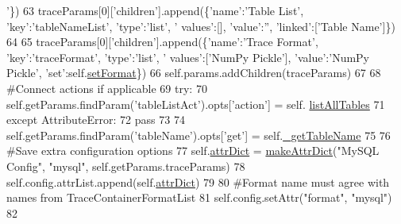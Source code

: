 \begin{DoxyCode}
{      '}\})
63             traceParams[0][\textcolor{stringliteral}{'children'}].append(\{\textcolor{stringliteral}{'name'}:\textcolor{stringliteral}{'Table List'}, \textcolor{stringliteral}{'key'}:\textcolor{stringliteral}{'tableNameList'}, \textcolor{stringliteral}{'type'}:\textcolor{stringliteral}{'list'}, \textcolor{stringliteral}{'
      values'}:[], \textcolor{stringliteral}{'value'}:\textcolor{stringliteral}{''}, \textcolor{stringliteral}{'linked'}:[\textcolor{stringliteral}{'Table Name'}]\})
64 
65         traceParams[0][\textcolor{stringliteral}{'children'}].append(\{\textcolor{stringliteral}{'name'}:\textcolor{stringliteral}{'Trace Format'}, \textcolor{stringliteral}{'key'}:\textcolor{stringliteral}{'traceFormat'}, \textcolor{stringliteral}{'type'}:\textcolor{stringliteral}{'list'}, \textcolor{stringliteral}{'
      values'}:[\textcolor{stringliteral}{'NumPy Pickle'}], \textcolor{stringliteral}{'value'}:\textcolor{stringliteral}{'NumPy Pickle'}, \textcolor{stringliteral}{'set'}:self.\hyperlink{classsoftware_1_1chipwhisperer_1_1common_1_1traces_1_1TraceContainerMySQL_1_1TraceContainerMySQL_a62390b52306cbe5684f4528fd9131b7b}{setFormat}\})
66         self.params.addChildren(traceParams)
67 
68         \textcolor{comment}{#Connect actions if applicable}
69         \textcolor{keywordflow}{try}:
70             self.getParams.findParam(\textcolor{stringliteral}{'tableListAct'}).opts[\textcolor{stringliteral}{'action'}] = self.
      \hyperlink{classsoftware_1_1chipwhisperer_1_1common_1_1traces_1_1TraceContainerMySQL_1_1TraceContainerMySQL_a7a9a1bc42177d049f29f0d42d1cb89ee}{listAllTables}
71         \textcolor{keywordflow}{except} AttributeError:
72             \textcolor{keywordflow}{pass}
73 
74         self.getParams.findParam(\textcolor{stringliteral}{'tableName'}).opts[\textcolor{stringliteral}{'get'}] = self.\hyperlink{classsoftware_1_1chipwhisperer_1_1common_1_1traces_1_1TraceContainerMySQL_1_1TraceContainerMySQL_a335e90ac8265b57bd105e33c2a8159be}{\_getTableName}
75 
76         \textcolor{comment}{#Save extra configuration options}
77         self.\hyperlink{classsoftware_1_1chipwhisperer_1_1common_1_1traces_1_1TraceContainerMySQL_1_1TraceContainerMySQL_ab96ec5b9ad96db040834e917b796d244}{attrDict} = \hyperlink{namespacesoftware_1_1chipwhisperer_1_1common_1_1traces_1_1__cfgfile_ae5242f90d9cfb290f14d59027088de1e}{makeAttrDict}(\textcolor{stringliteral}{"MySQL Config"}, \textcolor{stringliteral}{"mysql"}, 
      self.getParams.traceParams)
78         self.config.attrList.append(self.\hyperlink{classsoftware_1_1chipwhisperer_1_1common_1_1traces_1_1TraceContainerMySQL_1_1TraceContainerMySQL_ab96ec5b9ad96db040834e917b796d244}{attrDict})
79 
80         \textcolor{comment}{#Format name must agree with names from TraceContainerFormatList}
81         self.config.setAttr(\textcolor{stringliteral}{"format"}, \textcolor{stringliteral}{"mysql"})
82 
\end{DoxyCode}


